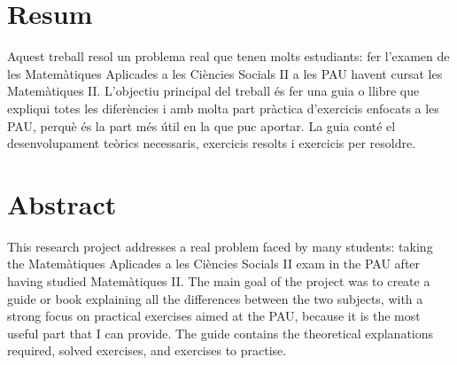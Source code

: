 \section*{Resum}
Aquest treball resol un problema real que tenen molts estudiants: fer l'examen de les Matemàtiques Aplicades a les Ciències Socials II a les PAU havent cursat les Matemàtiques II. L'objectiu principal del treball és fer una guia o llibre que expliqui totes les diferències i amb molta part pràctica d'exercicis enfocats a les PAU, perquè és la part més útil en la que puc aportar. La guia conté el desenvolupament teòrics necessaris, exercicis resolts i exercicis per resoldre.

\section*{Abstract}
This research project addresses a real problem faced by many students: taking the Matemàtiques Aplicades a les Ciències Socials II exam in the PAU after having studied Matemàtiques II. The main goal of the project was to create a guide or book explaining all the differences between the two subjects, with a strong focus on practical exercises aimed at the PAU, because it is the most useful part that I can provide. The guide contains the theoretical  explanations required, solved exercises, and exercises to practise.

